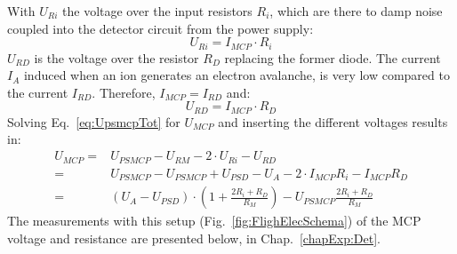 	With $U_{Ri}$ the voltage over the input resistors $R_i$, which are there to damp noise coupled into the detector circuit from the power supply:
	\begin{equation}
		U_{Ri} = I_{MCP}\cdot R_i
	\end{equation} 
	$U_{RD}$ is the voltage over the resistor $R_D$ replacing the former diode. The current $I_A$ induced when an ion generates an electron avalanche, is very low compared to the current $I_{RD}$. Therefore, $I_{MCP} = I_{RD}$ and:
	\begin{equation}
		U_{RD} = I_{MCP}\cdot R_D
	\end{equation}
	Solving Eq.~\eqref{eq:UpsmcpTot} for $U_{MCP}$ and inserting the different voltages results in:
	\begin{align}
		U_{MCP} =& U_{PSMCP} - U_{RM} - 2\cdot U_{Ri} - U_{RD}\\
				=& U_{PSMCP} - U_{PSMCP} + U_{PSD} - U_A - 2\cdot I_{MCP} R_i - I_{MCP} R_D\\
				=& (U_A - U_{PSD})\cdot\left(1 + \frac{2R_i + R_D}{R_M}\right) - U_{PSMCP}\frac{2R_i + R_D}{R_M}
	\end{align}	
	The measurements with this setup (Fig.~\ref{fig:FlighElecSchema}) of the MCP voltage and resistance are presented below, in Chap.~\ref{chapExp:Det}.
	

